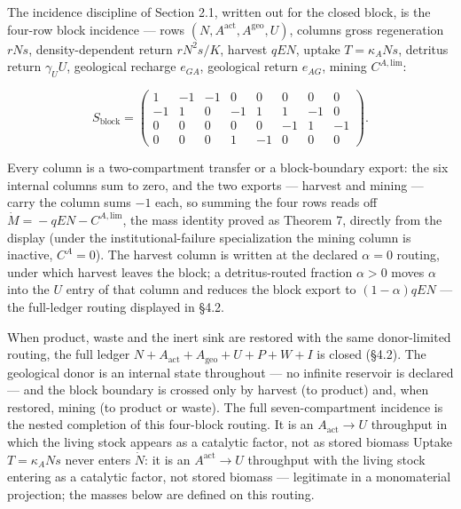 \documentclass[11pt]{article}
\begin{document}
The incidence discipline of Section 2.1, written out for the closed block, is the four-row block incidence --- rows \((N,\allowbreak{} A^{\mathrm{act}},\allowbreak{} A^{\mathrm{geo}},\allowbreak{} U)\), columns gross regeneration \(rNs\), density-dependent return \(rN^2 s/\allowbreak{}K\), harvest \(qEN\), uptake \(T = \kappa_A N s\), detritus return \(\gamma_U U\), geological recharge \(e_{GA}\), geological return \(e_{AG}\), mining \(C^{A,\mathrm{lim}}\): 

$$S_{\mathrm{block}} = \begin{pmatrix} 1 & -1 & -1 & 0 & 0 & 0 & 0 & 0 \\ -1 & 1 & 0 & -1 & 1 & 1 & -1 & 0 \\ 0 & 0 & 0 & 0 & 0 & -1 & 1 & -1 \\ 0 & 0 & 0 & 1 & -1 & 0 & 0 & 0 \end{pmatrix}.$$

 Every column is a two-compartment transfer or a block-boundary export: the six internal columns sum to zero, and the two exports --- harvest and mining --- carry the column sums \(-1\) each, so summing the four rows reads off \(\dot M =\allowbreak{} -qEN - C^{A,\allowbreak{}\mathrm{lim}}\), the mass identity proved as Theorem 7, directly from the display (under the institutional-failure specialization the mining column is inactive, \(C^A = 0\)). The harvest column is written at the declared \(\alpha=0\) routing, under which harvest leaves the block; a detritus-routed fraction \(\alpha>0\) moves \(\alpha\) into the \(U\) entry of that column and reduces the block export to \((1-\alpha)qEN\) --- the full-ledger routing displayed in \S4.2.

When product, waste and the inert sink are restored with the same donor-limited routing, the full ledger \(N+\allowbreak{}A_{\mathrm{act}}+\allowbreak{}A_{\mathrm{geo}}+\allowbreak{}U+\allowbreak{}P+\allowbreak{}W+\allowbreak{}I\) is closed (\S4.2). The geological donor is an internal state throughout --- no infinite reservoir is declared --- and the block boundary is crossed only by harvest (to product) and, when restored, mining (to product or waste). The full seven-compartment incidence is the nested completion of this four-block routing. It is an \(A_{\mathrm{act}}\to U\) throughput in which the living stock appears as a catalytic factor, not as stored biomass Uptake \(T = \kappa_A N s\) never enters \(\dot N\): it is an \(A^{\mathrm{act}} \to U\) throughput with the living stock entering as a catalytic factor, not stored biomass --- legitimate in a monomaterial projection; the masses below are defined on this routing.
\end{document}
